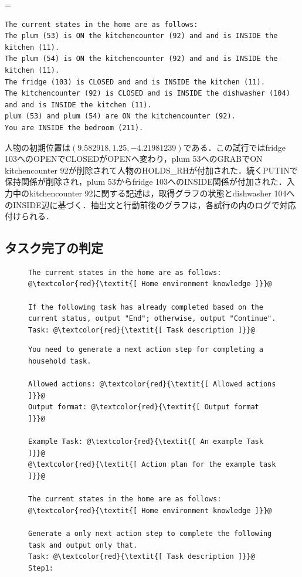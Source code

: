 \begingroup
\capwidth=\linewidth
\begin{lstlisting}[basicstyle=\ttfamily\scriptsize,breaklines=true,caption={配置task65の環境知識全文},label=lst:real_placement_input]
The current states in the home are as follows:
The plum (53) is ON the kitchencounter (92) and and is INSIDE the kitchen (11).
The plum (54) is ON the kitchencounter (92) and and is INSIDE the kitchen (11).
The fridge (103) is CLOSED and and is INSIDE the kitchen (11).
The kitchencounter (92) is CLOSED and is INSIDE the dishwasher (104) and and is INSIDE the kitchen (11).
plum (53) and plum (54) are ON the kitchencounter (92).
You are INSIDE the bedroom (211).

\end{lstlisting}
\endgroup
人物の初期位置は$(9.582918,1.25,-4.21981239)$である．この試行ではfridge 103へのOPENでCLOSEDがOPENへ変わり，plum 53へのGRABでON kitchencounter 92が削除されて人物のHOLDS\_RHが付加された．続くPUTINで保持関係が削除され，plum 53からfridge 103へのINSIDE関係が付加された．入力中のkitchencounter 92に関する記述は，取得グラフの状態とdishwasher 104へのINSIDE辺に基づく．抽出文と行動前後のグラフは，各試行の内のログで対応付けられる．

\subsection{タスク完了の判定} \label{sec4.2}
\begin{figure}[tb]
    \begin{lstlisting}[caption=「タスク完了の判定」で用いるプロンプトテンプレート, label=prompt1]
The current states in the home are as follows: 
@\textcolor{red}{\textit{[ Home environment knowledge ]}}@

If the following task has already completed based on the current status, output "End"; otherwise, output "Continue".
Task: @\textcolor{red}{\textit{[ Task description ]}}@
    \end{lstlisting}
\end{figure}

\begin{figure}[tb]
    \begin{lstlisting}[caption=「アクションステップ生成」で用いるプロンプトテンプレート, label=prompt2]
You need to generate a next action step for completing a household task.

Allowed actions: @\textcolor{red}{\textit{[ Allowed actions ]}}@
Output format: @\textcolor{red}{\textit{[ Output format ]}}@

Example Task: @\textcolor{red}{\textit{[ An example Task ]}}@
@\textcolor{red}{\textit{[ Action plan for the example task ]}}@

The current states in the home are as follows: 
@\textcolor{red}{\textit{[ Home environment knowledge ]}}@

Generate a only next action step to complete the following task and output only that.
Task: @\textcolor{red}{\textit{[ Task description ]}}@
Step1:
    \end{lstlisting}
\end{figure}

